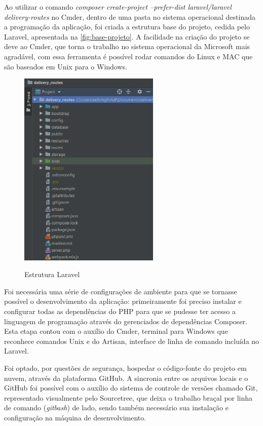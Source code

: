 Ao utilizar o comando \textit{composer create-project --prefer-dist laravel/laravel delivery-routes} no Cmder, dentro de uma pasta no sistema operacional destinada a programação da aplicação, foi criada a estrutura base do projeto, cedida pelo Laravel, apresentada na \autoref{fig:base-projeto}. A facilidade na criação do projeto se deve ao Cmder, que torna o trabalho no sistema operacional da Microsoft mais agradável, com essa ferramenta é possível rodar comandos do Linux e MAC que são baseados em Unix para o Windows. 

\begin{figure}[H]
    \centering
    \caption{Estrutura Laravel}
    \includegraphics[width=0.6\textwidth]{./dados/figuras/fig6}
    \label{fig:base-projeto}
\end{figure}

\newpage
Foi necessária uma série de configurações de ambiente para que se tornasse possível o desenvolvimento da aplicação: primeiramente foi preciso instalar e configurar todas as dependências do PHP para que se pudesse ter acesso a linguagem de programação através do gerenciados de dependências Composer. Esta etapa contou com o auxílio do Cmder, terminal para Windows que reconhece comandos Unix e do Artisan, interface de linha de comando incluída no Laravel.

Foi optado, por questões de segurança, hospedar o código-fonte do projeto em nuvem, através da plataforma GitHub. A sincronia entre os arquivos locais e o GitHub foi possível com o auxílio do sistema de controle de versões chamado Git, representado visualmente pelo Sourcetree, que deixa o trabalho braçal por linha de comando (\textit{gitbash}) de lado, sendo também necessário sua instalação e configuração na máquina de desenvolvimento. 

